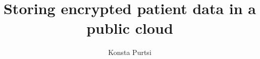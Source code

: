 \documentclass[language=english,version=final,mainfont=none,sharelatex=true,minted=true]{utuftthesis}
\providecommand{\algorithmname}{Algoritmi}
\begin{document}
\title{Storing encrypted patient data in a public cloud}
\author{Konsta Purtsi}

\maketitle


\tableofcontents

\begin{comment}
\listoffigures

\listoftables

\listofacronyms

\end{comment}

\renewcommand{\algorithmname}{\listingscaption}









% 


\printbibliography



\end{document}
